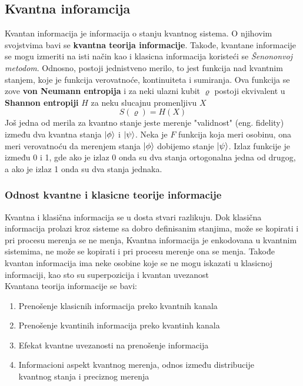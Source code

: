 \documentclass[12pt, letterpaper, oneside]{article}
\begin{document}
\subsection{Kvantna inforamcija}
Kvantan informacija je informacija o stanju kvantnog sistema. O njihovim svojstvima bavi se \textbf{kvantna teorija informacije}.
Takođe, kvantane informacije se mogu izmeriti na isti način kao i klasicna informacija koristeći se \textit{Šenononvoj metodom}. 
Odnosno, postoji jednistveno merilo, to jest funkcija nad kvantnim stanjem, koje je funkcija verovatnoće, kontinuiteta i sumiranja.\cite{vlatko_v}
Ova funkcija se zove \textbf{von Neumann entropija} i za neki ulazni kubit $\varrho$ postoji ekvivalent u  \textbf{Shannon entropiji} $H$
za neku slucajnu promenljivu $X$
\[
    S(\varrho) = H(X)
\]
Još jedna od merila za kvantno stanje jeste merenje "validnost" (eng. fidelity) između dva kvantna stanja $\ket{\phi}$ i $\ket{\psi}$.
Neka je $F$ funkcija koja meri osobinu, ona meri verovatnoću da merenjem stanja $\ket{\phi}$ dobijemo stanje $\ket{\psi}$.
Izlaz funkcije je između 0 i 1, gde ako je izlaz 0 onda su dva stanja ortogonalna jedna od drugog, a ako je izlaz 1 onda su dva stanja jednaka.\cite{vlatko_v}
\subsubsection*{Odnost kvantne i klasicne teorije informacije}
Kvantna i klasična informacija se u dosta stvari razlikuju. Dok klasična informacija prolazi kroz sisteme sa dobro definisanim stanjima, može se kopirati i pri procesu merenja se ne menja,
Kvantna informacija je enkodovana u kvantnim sistemima, ne može se kopirati i pri procesu merenje ona se menja. Takođe kvantan informacija ima neke osobine koje se ne
mogu iskazati u klasicnoj informaciji, kao sto su superpozicija i kvantan uvezanost \cite{Classical&quantum_info} \\
Kvantana teorija informacije se bavi: 
\begin{enumerate}
    \item Prenošenje klasicnih informacija preko kvantnih kanala
    \item Prenošenje kvantinih informacija preko kvantinh kanala
    \item Efekat kvantne uvezanosti na prenošenje informacija
    \item Informacioni aspekt kvantnog merenja, odnos između distribucije \\
    kvantnog stanja i preciznog merenja
\end{enumerate}
\end{document}
